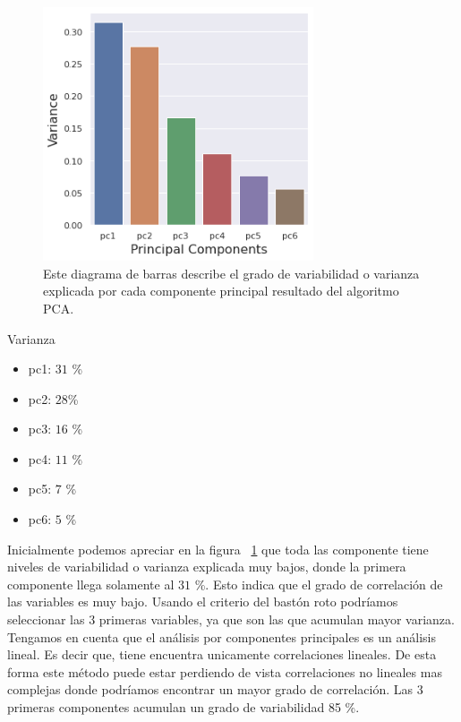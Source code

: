 \documentclass[11pt,a4paper,twoside]{thesis}
\begin{document}
\begin{figure}[h!]
	\centering
	\includegraphics[width=8cm]{./images/PCA-Variance.png}
	\caption{Este diagrama de barras describe el grado de variabilidad o varianza explicada por cada componente principal resultado del algoritmo PCA.}
	\label{fig:explainedVariancePlot}
\end{figure}


\begin{description}
	\item[Varianza]
\end{description}
\begin{itemize}
	\item pc1: $31$ \%
	\item pc2: $28$\%
	\item pc3: $16$ \%
	\item pc4: $11$ \%
	\item pc5: $7$ \%
	\item pc6: $5$ \%
\end{itemize}

Inicialmente podemos apreciar en la figura ~\ref{fig:explainedVariancePlot} que toda las componente tiene niveles de variabilidad o varianza explicada muy bajos, donde la primera componente llega solamente al $31$ \%. Esto indica que el grado de correlación de las variables es muy bajo. Usando el criterio del bastón roto podríamos seleccionar las 3 primeras variables, ya que son las que acumulan mayor varianza. Tengamos en cuenta que el análisis por componentes principales es un análisis lineal. Es decir que, tiene encuentra unicamente correlaciones lineales. De esta forma este método puede estar perdiendo de vista correlaciones no lineales mas complejas donde podríamos encontrar un mayor grado de correlación. Las 3 primeras componentes acumulan un grado de variabilidad 85 \%.
\end{document}
